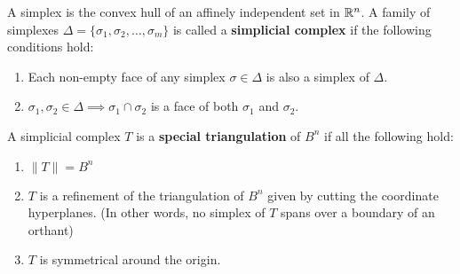 A simplex is the convex hull of an affinely independent set in $\mathbb R^n$. A family of simplexes $\Delta = \{\sigma_1,\sigma_2, \dots, \sigma_m\}$ is called a \textbf{simplicial complex} if the following conditions hold:
\begin{enumerate}
    \item Each non-empty face of any simplex $\sigma \in \Delta$ is also a simplex of $\Delta$.
    \item $\sigma_1, \sigma_2 \in \Delta \implies \sigma_1 \cap \sigma_2$ is a face of both $\sigma_1$ and $\sigma_2$.
\end{enumerate}
A simplicial complex $T$ is a \textbf{special triangulation} of $B^n$ if all the following hold:
\begin{enumerate}
    \item $\|T\| = B^n$
    \item $T$ is a refinement of the triangulation of $B^n$ given by cutting the coordinate hyperplanes. (In other words, no simplex of $T$ spans over a boundary of an orthant)
    \item $T$ is symmetrical around the origin.
\end{enumerate}

